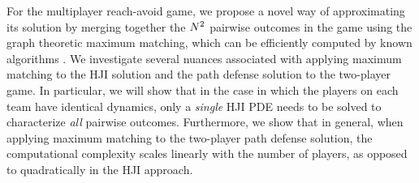 For the multiplayer reach-avoid game, we propose a novel way of approximating its solution by merging together the $N^2$ pairwise outcomes in the game using the graph theoretic maximum matching, which can be efficiently computed by known algorithms \cite{Schrjiver2004, Karpinski1998}. We investigate several nuances associated with applying maximum matching to the HJI solution and the path defense solution to the two-player game. In particular, we will show that in the case in which the players on each team have identical dynamics, only a \textit{single} HJI PDE needs to be solved to characterize \textit{all} pairwise outcomes. Furthermore, we show that in general, when applying maximum matching to the two-player path defense solution, the computational complexity scales linearly with the number of players, as opposed to quadratically in the HJI approach.